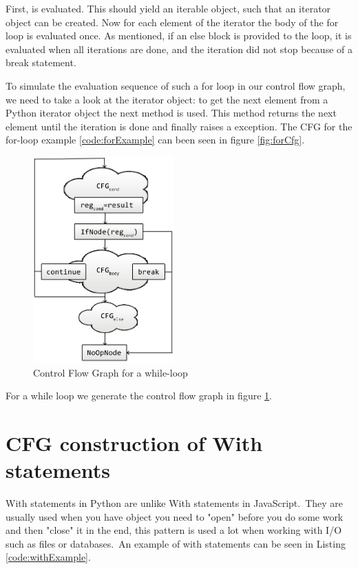 First,  is evaluated. This should yield an iterable object, such that an iterator object can be created. 
Now for each element of the iterator the body of the for loop is evaluated once. As mentioned, if an else block is provided to the loop, 
it is evaluated when all iterations are done, and the iteration did not stop because of a break statement. 

To simulate the evaluation sequence of such a for loop in our control flow graph, we need to take a look at the iterator object: 
to get the next element from a Python iterator object the next method is used. 
This method returns the next element until the iteration is done and finally raises a  exception. 
The CFG for the for-loop example \ref{code:forExample} can been seen in figure \ref{fig:forCfg}.

\begin{figure}
  \vspace{-20pt}
  \begin{center}
    \includegraphics[width=0.48\textwidth]{images/while.png}
  \end{center}
  \vspace{-10pt}
  \caption{Control Flow Graph for a while-loop}
  \label{fig:whileCfg}
  \vspace{-10pt}
\end{figure}

For a while loop we generate the control flow graph in figure \ref{fig:whileCfg}.

\section{CFG construction of With statements}
With statements in Python are unlike With statements in JavaScript.\ They are usually used when you have object you need to "open" before you do some work and then "close" it in the end, this pattern is used a lot when working with I/O such as files or databases.\ An example of with statements can be seen in Listing \ref{code:withExample}.

